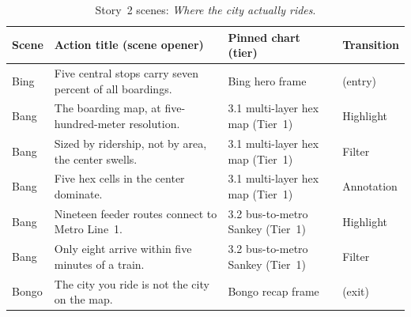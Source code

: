 \begin{table}[!htbp]
\centering
\caption{Story~2 scenes: \textit{Where the city actually rides}.}
\label{tab:themes:story_spatial}
\footnotesize
\begin{tabularx}{\linewidth}{p{0.8cm}Xp{2.7cm}p{1.6cm}}
\hline
\textbf{Scene} & \textbf{Action title (scene opener)} & \textbf{Pinned chart (tier)} & \textbf{Transition} \\
\hline
Bing  & Five central stops carry seven percent of all boardings.                       & Bing hero frame                          & (entry)    \\
Bang  & The boarding map, at five-hundred-meter resolution.                            & 3.1 multi-layer hex map (Tier~1)         & Highlight  \\
Bang  & Sized by ridership, not by area, the center swells.                            & 3.1 multi-layer hex map (Tier~1)         & Filter     \\
Bang  & Five hex cells in the center dominate.                                         & 3.1 multi-layer hex map (Tier~1)         & Annotation \\
Bang  & Nineteen feeder routes connect to Metro Line~1.                                & 3.2 bus-to-metro Sankey (Tier~1)         & Highlight  \\
Bang  & Only eight arrive within five minutes of a train.                             & 3.2 bus-to-metro Sankey (Tier~1)         & Filter     \\
Bongo & The city you ride is not the city on the map.                                  & Bongo recap frame                        & (exit)     \\
\hline
\end{tabularx}
\end{table}

